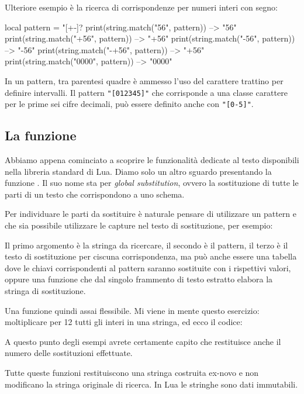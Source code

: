 Ulteriore esempio è la ricerca di corrispondenze per numeri interi con segno:
\begin{lines}
local pattern = "[+-]?%
print(string.match("56", pattern))   --> "56"
print(string.match("+56", pattern))  --> "+56"
print(string.match("-56", pattern))  --> "-56"
print(string.match("-+56", pattern)) --> "+56"
print(string.match("0000", pattern)) --> "0000"
\end{lines}

In un pattern, tra parentesi quadre è ammesso l'uso del carattere trattino per
definire intervalli. Il pattern \verb|"[012345]"| che corrisponde a una classe
carattere per le prime sei cifre decimali, può essere definito anche con
\verb|"[0-5]"|.


\subsection{La funzione }
\label{secFondGsub}

Abbiamo appena cominciato a scoprire le funzionalità dedicate al testo
disponibili nella libreria standard di Lua. Diamo solo un altro sguardo
presentando la funzione . Il suo nome sta
per \emph{global substitution}, ovvero la sostituzione di tutte le parti di un
testo che corrispondono a uno schema.

Per individuare le parti da sostituire è naturale pensare di utilizzare un
pattern e che sia possibile utilizzare le capture nel testo di sostituzione, per
esempio:

Il primo argomento è la stringa da ricercare, il secondo è il pattern, il terzo
è il testo di sostituzione per ciscuna corrispondenza, ma può anche essere una
tabella dove le chiavi corrispondenti al pattern saranno sostituite con i
rispettivi valori, oppure una funzione che dal singolo frammento di testo
estratto elabora la stringa di sostituzione.

Una funzione quindi assai flessibile. Mi viene in mente questo esercizio:
moltiplicare per 12 tutti gli interi in una stringa, ed ecco il codice:

A questo punto degli esempi avrete certamente capito che  restituisce
anche il numero delle sostituzioni effettuate.

Tutte queste funzioni restituiscono una stringa costruita ex-novo e non
modificano la stringa originale di ricerca. In Lua le stringhe sono dati
immutabili.

